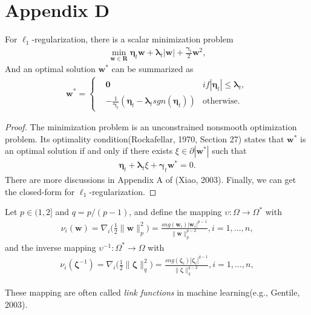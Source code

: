 \documentclass[10pt]{llncs}
\begin{document}
\section{Appendix D}
\begin{lemma}
For $\ell_1$-regularization, there is a scalar minimization problem
  \begin{align*}
    \min\limits_{\mathbf{w} \in \mathbf{R}} \mathbf{\eta}_t\mathbf{w}+\mathbf{\lambda}_t|\mathbf{w}|+\frac{\mathbf{\gamma}_t}{2}\mathbf{w}^2,
  \end{align*}
And an optimal solution $\mathbf{w}^\ast$ can be summarized as
  \begin{align*}
    \mathbf{w}^\ast=\left\{
        \begin{aligned}
        &\mathbf{0}  &if |\mathbf{\eta}_t| \leq \mathbf{\lambda}_t,\\
        &-\frac{1}{\mathbf{\gamma}_t}(\mathbf{\eta}_t-\mathbf{\lambda}_t sgn(\mathbf{\eta}_t)) &\textrm{otherwise}.
        \end{aligned}
    \right.
  \end{align*}
\end{lemma}
\begin{proof}
The minimization problem is an unconstrained nonsmooth optimization problem. Its optimality condition(Rockafellar, 1970, Section 27) states that $\mathbf{w}^\ast$ is an optimal solution if and only if there exists $\xi \in \partial|\mathbf{w}^\ast|$ such that
\begin{align*}
    \mathbf{\eta}_t+\mathbf{\lambda}_t\xi+\mathbf{\gamma}_t\mathbf{w}^\ast=0.
\end{align*}
There are more discussions in Appendix A of (Xiao, 2003). Finally, we can get the closed-form for $\ell_1$-regularization.
\end{proof}

\begin{lemma}
  \label{inverse-mapping}
  Let $p \in (1,2]$ and $q=p/(p-1)$, and define the mapping $\upsilon:\Omega \to \Omega^\ast$ with
  \begin{align*}
    \nu_i(\mathbf{w})=\nabla_i\Big(\frac{1}{2}\|\mathbf{w}\|_p^2\Big)=\frac{sng(\mathbf{w}_i)|\mathbf{w}_i|^{p-1}}{\|\mathbf{w}\|_p^{p-2}}, i=1,\ldots,n,
  \end{align*}
and the inverse mapping $\upsilon^{-1}:\Omega^\ast \to \Omega$ with
  \begin{align*}
    \nu_i(\mathbf{\zeta}^{-1})=\nabla_i\Big(\frac{1}{2}\|\mathbf{\zeta}\|_q^2\Big)=\frac{sng(\mathbf{\zeta}_i)|\mathbf{\zeta}_i|^{q-1}}{\|\mathbf{\zeta}\|_q^{q-2}}, i=1,\ldots,n,
  \end{align*}
\end{lemma}
These mapping are often called {\em link functions} in machine learning(e.g., Gentile, 2003).
\end{document}
